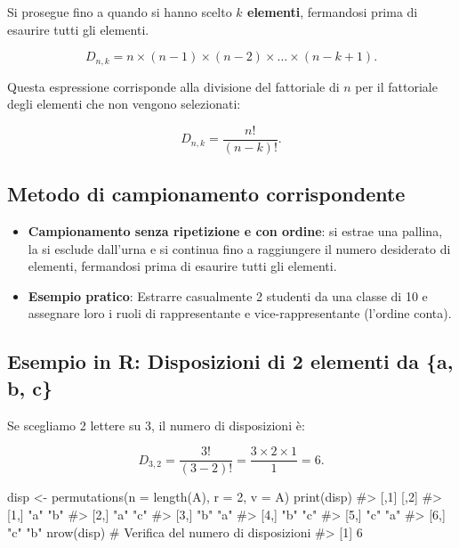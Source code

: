 \documentclass[
  italian,
  letterpaper,
  a4paper,
  11pt,
  open=any]{scrbook}
\newenvironment{Shaded}{\begin{snugshade}}{\end{snugshade}}
\newcommand{\AttributeTok}[1]{\textcolor[rgb]{0.40,0.45,0.13}{#1}}
\newcommand{\CommentTok}[1]{\textcolor[rgb]{0.37,0.37,0.37}{#1}}
\newcommand{\DecValTok}[1]{\textcolor[rgb]{0.68,0.00,0.00}{#1}}
\newcommand{\FunctionTok}[1]{\textcolor[rgb]{0.28,0.35,0.67}{#1}}
\newcommand{\NormalTok}[1]{\textcolor[rgb]{0.00,0.23,0.31}{#1}}
\newcommand{\OtherTok}[1]{\textcolor[rgb]{0.00,0.23,0.31}{#1}}
\providecommand{\tightlist}{%
  \setlength{\itemsep}{0pt}\setlength{\parskip}{0pt}}
\theoremstyle{plain}
\theoremstyle{definition}
\theoremstyle{definition}
\theoremstyle{remark}
\begin{document}
Si prosegue fino a quando si hanno scelto \textbf{\(k\) elementi},
fermandosi prima di esaurire tutti gli elementi.

\[
D_{n,k} = n \times (n-1) \times (n-2) \times \dots \times (n-k+1) .
\]

Questa espressione corrisponde alla divisione del fattoriale di \(n\)
per il fattoriale degli elementi che non vengono selezionati:

\[
D_{n,k} = \frac{n!}{(n-k)!} .
\]

\subsection{Metodo di campionamento
corrispondente}\label{metodo-di-campionamento-corrispondente-1}

\begin{itemize}
\tightlist
\item
  \textbf{Campionamento senza ripetizione e con ordine}: si estrae una
  pallina, la si esclude dall'urna e si continua fino a raggiungere il
  numero desiderato di elementi, fermandosi prima di esaurire tutti gli
  elementi.\\
\item
  \textbf{Esempio pratico}: Estrarre casualmente 2 studenti da una
  classe di 10 e assegnare loro i ruoli di rappresentante e
  vice-rappresentante (l'ordine conta).
\end{itemize}

\subsection{Esempio in R: Disposizioni di 2 elementi da \{a, b,
c\}}\label{esempio-in-r-disposizioni-di-2-elementi-da-a-b-c}

Se scegliamo 2 lettere su 3, il numero di disposizioni è:

\[
D_{3,2} = \frac{3!}{(3-2)!} = \frac{3 \times 2 \times 1}{1} = 6.
\]

\begin{Shaded}
\begin{Highlighting}[]
\NormalTok{disp }\OtherTok{\textless{}{-}} \FunctionTok{permutations}\NormalTok{(}\AttributeTok{n =} \FunctionTok{length}\NormalTok{(A), }\AttributeTok{r =} \DecValTok{2}\NormalTok{, }\AttributeTok{v =}\NormalTok{ A)}
\FunctionTok{print}\NormalTok{(disp)}
\CommentTok{\#\textgreater{}      [,1] [,2]}
\CommentTok{\#\textgreater{} [1,] "a"  "b" }
\CommentTok{\#\textgreater{} [2,] "a"  "c" }
\CommentTok{\#\textgreater{} [3,] "b"  "a" }
\CommentTok{\#\textgreater{} [4,] "b"  "c" }
\CommentTok{\#\textgreater{} [5,] "c"  "a" }
\CommentTok{\#\textgreater{} [6,] "c"  "b"}
\FunctionTok{nrow}\NormalTok{(disp)  }\CommentTok{\# Verifica del numero di disposizioni}
\CommentTok{\#\textgreater{} [1] 6}
\end{Highlighting}
\end{Shaded}
\end{document}
